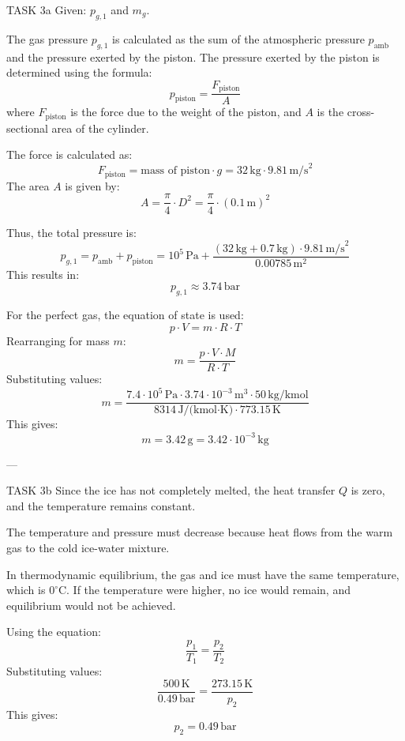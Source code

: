 TASK 3a  
Given: \( p_{g,1} \) and \( m_g \).  

The gas pressure \( p_{g,1} \) is calculated as the sum of the atmospheric pressure \( p_{\text{amb}} \) and the pressure exerted by the piston. The pressure exerted by the piston is determined using the formula:  
\[
p_{\text{piston}} = \frac{F_{\text{piston}}}{A}
\]  
where \( F_{\text{piston}} \) is the force due to the weight of the piston, and \( A \) is the cross-sectional area of the cylinder.  

The force is calculated as:  
\[
F_{\text{piston}} = \text{mass of piston} \cdot g = 32 \, \text{kg} \cdot 9.81 \, \text{m/s}^2
\]  
The area \( A \) is given by:  
\[
A = \frac{\pi}{4} \cdot D^2 = \frac{\pi}{4} \cdot (0.1 \, \text{m})^2
\]  

Thus, the total pressure is:  
\[
p_{g,1} = p_{\text{amb}} + p_{\text{piston}} = 10^5 \, \text{Pa} + \frac{(32 \, \text{kg} + 0.7 \, \text{kg}) \cdot 9.81 \, \text{m/s}^2}{0.00785 \, \text{m}^2}
\]  
This results in:  
\[
p_{g,1} \approx 3.74 \, \text{bar}
\]  

For the perfect gas, the equation of state is used:  
\[
p \cdot V = m \cdot R \cdot T
\]  
Rearranging for mass \( m \):  
\[
m = \frac{p \cdot V \cdot M}{R \cdot T}
\]  
Substituting values:  
\[
m = \frac{7.4 \cdot 10^5 \, \text{Pa} \cdot 3.74 \cdot 10^{-3} \, \text{m}^3 \cdot 50 \, \text{kg/kmol}}{8314 \, \text{J/(kmol·K)} \cdot 773.15 \, \text{K}}
\]  
This gives:  
\[
m = 3.42 \, \text{g} = 3.42 \cdot 10^{-3} \, \text{kg}
\]  

---

TASK 3b  
Since the ice has not completely melted, the heat transfer \( Q \) is zero, and the temperature remains constant.  

The temperature and pressure must decrease because heat flows from the warm gas to the cold ice-water mixture.  

In thermodynamic equilibrium, the gas and ice must have the same temperature, which is \( 0^\circ\text{C} \). If the temperature were higher, no ice would remain, and equilibrium would not be achieved.  

Using the equation:  
\[
\frac{p_1}{T_1} = \frac{p_2}{T_2}
\]  
Substituting values:  
\[
\frac{500 \, \text{K}}{0.49 \, \text{bar}} = \frac{273.15 \, \text{K}}{p_2}
\]  
This gives:  
\[
p_2 = 0.49 \, \text{bar}
\]  

